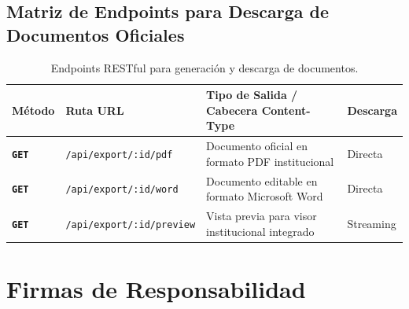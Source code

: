 \documentclass[12pt,a4paper]{article}
\begin{document}
\subsection{Matriz de Endpoints para Descarga de Documentos Oficiales}
\begin{table}[H]
\centering
\small
\renewcommand{\arraystretch}{1.2}
\begin{tabularx}{\textwidth}{|>{\hsize=0.45\hsize\centering\arraybackslash\bfseries\footnotesize}X|>{\hsize=1.20\hsize\raggedright\arraybackslash\footnotesize}X|>{\hsize=1.75\hsize\raggedright\arraybackslash\footnotesize}X|>{\hsize=0.6\hsize\centering\arraybackslash\footnotesize}X|}
\hline
\rowcolor{tableheader}
\textbf{Método} & \textbf{Ruta URL} & \textbf{Tipo de Salida / Cabecera Content-Type} & \textbf{Descarga} \\
\hline
\texttt{GET} & \texttt{/\allowbreak  api/\allowbreak  export/\allowbreak  :id/\allowbreak  pdf} & Documento oficial en formato PDF institucional & Directa \\
\hline
\texttt{GET} & \texttt{/\allowbreak  api/\allowbreak  export/\allowbreak  :id/\allowbreak  word} & Documento editable en formato Microsoft Word & Directa \\
\hline
\texttt{GET} & \texttt{/\allowbreak  api/\allowbreak  export/\allowbreak   :id/\allowbreak  preview} & Vista previa para visor institucional integrado & Streaming \\
\hline
\end{tabularx}
\caption{Endpoints RESTful para generación y descarga de documentos.}
\end{table}

\section{Firmas de Responsabilidad}
\end{document}
